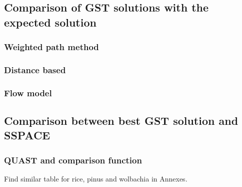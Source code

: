 \documentclass[12pt, twocolumn]{article}
\begin{document}
\subsection{Comparison of GST solutions with the expected solution}
\begin{table}[h!]
\begin{center}
\end{center}
\caption{Genscale scaffolders solutions}
\label{fig:solutions}
\end{table}

\subsubsection{Weighted path method}
\subsubsection{Distance based}
\subsubsection{Flow model}

\newpage
\subsection{Comparison between best GST solution and SSPACE}
\subsubsection{QUAST and comparison function}
Find similar table for rice, pinus and wolbachia in Annexes. 
\end{document}
